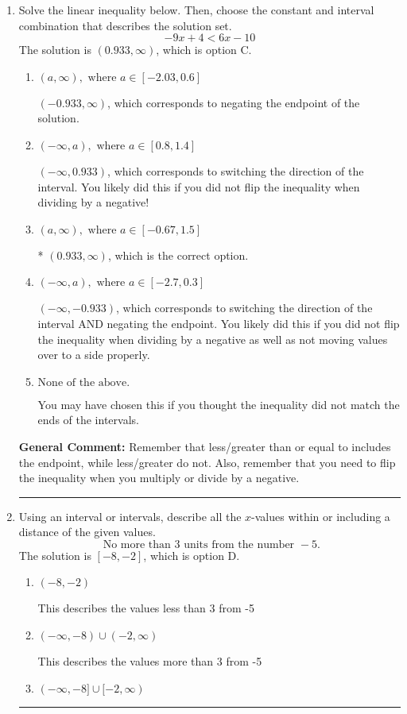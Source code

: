 \documentclass{extbook}[14pt]
\newcommand{\litem}[1]{\item #1

\rule{\textwidth}{0.4pt}}
\begin{document}
\begin{enumerate}\litem{
Solve the linear inequality below. Then, choose the constant and interval combination that describes the solution set.
\[ -9x + 4 < 6x -10 \]The solution is \( (0.933, \infty) \), which is option C.\begin{enumerate}[label=\Alph*.]
\item \( (a, \infty), \text{ where } a \in [-2.03, 0.6] \)

 $(-0.933, \infty)$, which corresponds to negating the endpoint of the solution.
\item \( (-\infty, a), \text{ where } a \in [0.8, 1.4] \)

 $(-\infty, 0.933)$, which corresponds to switching the direction of the interval. You likely did this if you did not flip the inequality when dividing by a negative!
\item \( (a, \infty), \text{ where } a \in [-0.67, 1.5] \)

* $(0.933, \infty)$, which is the correct option.
\item \( (-\infty, a), \text{ where } a \in [-2.7, 0.3] \)

 $(-\infty, -0.933)$, which corresponds to switching the direction of the interval AND negating the endpoint. You likely did this if you did not flip the inequality when dividing by a negative as well as not moving values over to a side properly.
\item \( \text{None of the above}. \)

You may have chosen this if you thought the inequality did not match the ends of the intervals.
\end{enumerate}

\textbf{General Comment:} Remember that less/greater than or equal to includes the endpoint, while less/greater do not. Also, remember that you need to flip the inequality when you multiply or divide by a negative.
}
\litem{
Using an interval or intervals, describe all the $x$-values within or including a distance of the given values.
\[ \text{ No more than } 3 \text{ units from the number } -5. \]The solution is \( [-8, -2] \), which is option D.\begin{enumerate}[label=\Alph*.]
\item \( (-8, -2) \)

This describes the values less than 3 from -5
\item \( (-\infty, -8) \cup (-2, \infty) \)

This describes the values more than 3 from -5
\item \( (-\infty, -8] \cup [-2, \infty) \)


\end{enumerate}}
\end{enumerate}
\end{document}
